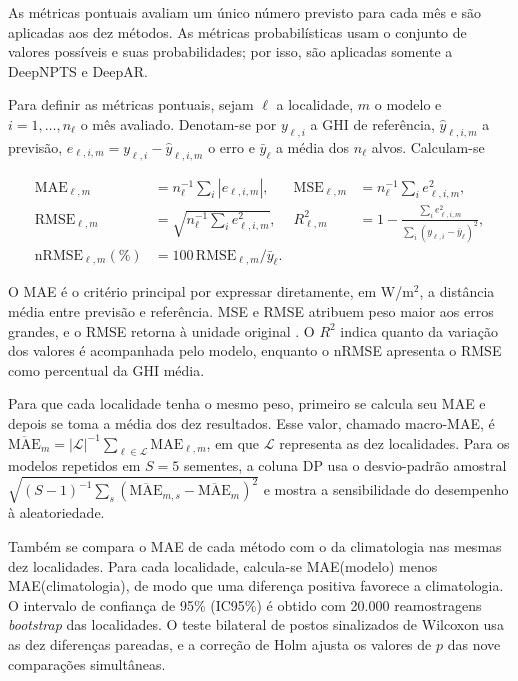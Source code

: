 \documentclass[12pt,a4paper,fleqn]{article}
\begin{document}
As métricas pontuais avaliam um único número previsto para cada mês e são aplicadas aos dez métodos. As métricas probabilísticas usam o conjunto de valores possíveis e suas probabilidades; por isso, são aplicadas somente a DeepNPTS e DeepAR.

Para definir as métricas pontuais, sejam $\ell$ a localidade, $m$ o modelo e $i=1,\ldots,n_\ell$ o mês avaliado. Denotam-se por $y_{\ell,i}$ a GHI de referência, $\widehat y_{\ell,i,m}$ a previsão, $e_{\ell,i,m}=y_{\ell,i}-\widehat y_{\ell,i,m}$ o erro e $\bar y_\ell$ a média dos $n_\ell$ alvos. Calculam-se

\begin{equation}
\begin{aligned}
 \mathrm{MAE}_{\ell,m}&=n_\ell^{-1}\sum_i|e_{\ell,i,m}|,&
 \mathrm{MSE}_{\ell,m}&=n_\ell^{-1}\sum_i e_{\ell,i,m}^2,\\
 \mathrm{RMSE}_{\ell,m}&=\sqrt{n_\ell^{-1}\sum_i e_{\ell,i,m}^2},&
 R^2_{\ell,m}&=1-\frac{\sum_i e_{\ell,i,m}^2}{\sum_i(y_{\ell,i}-\bar y_\ell)^2},\\
 \mathrm{nRMSE}_{\ell,m}(\%)&=100\,\mathrm{RMSE}_{\ell,m}/\bar y_\ell.&
\end{aligned}
\label{eq:metricas}
\end{equation}

O MAE é o critério principal por expressar diretamente, em W/m$^2$, a distância média entre previsão e referência. MSE e RMSE atribuem peso maior aos erros grandes, e o RMSE retorna à unidade original \citep{hyndman2006}. O $R^2$ indica quanto da variação dos valores é acompanhada pelo modelo, enquanto o nRMSE apresenta o RMSE como percentual da GHI média.

Para que cada localidade tenha o mesmo peso, primeiro se calcula seu MAE e depois se toma a média dos dez resultados. Esse valor, chamado macro-MAE, é $\overline{\mathrm{MAE}}_m=|\mathcal L|^{-1}\sum_{\ell\in\mathcal L}\mathrm{MAE}_{\ell,m}$, em que $\mathcal L$ representa as dez localidades. Para os modelos repetidos em $S=5$ sementes, a coluna DP usa o desvio-padrão amostral $\sqrt{(S-1)^{-1}\sum_s(\overline{\mathrm{MAE}}_{m,s}-\overline{\mathrm{MAE}}_m)^2}$ e mostra a sensibilidade do desempenho à aleatoriedade.

Também se compara o MAE de cada método com o da climatologia nas mesmas dez localidades. Para cada localidade, calcula-se MAE(modelo) menos MAE(climatologia), de modo que uma diferença positiva favorece a climatologia. O intervalo de confiança de 95\% (IC95\%) é obtido com 20.000 reamostragens \textit{bootstrap} das localidades. O teste bilateral de postos sinalizados de Wilcoxon usa as dez diferenças pareadas, e a correção de Holm ajusta os valores de $p$ das nove comparações simultâneas.
\end{document}
